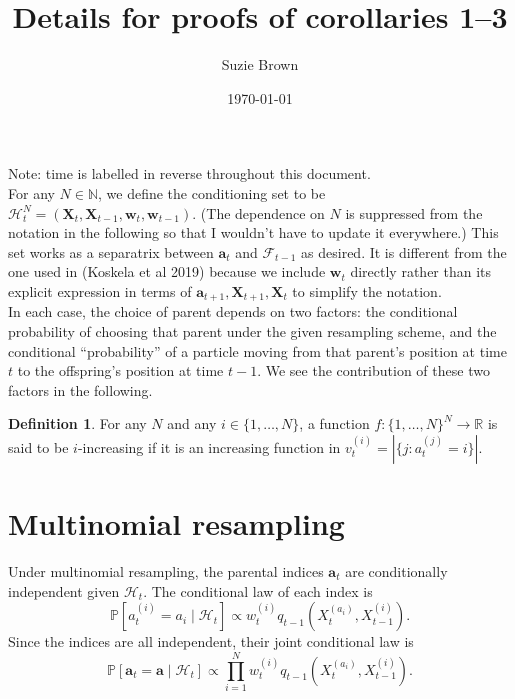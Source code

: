 \documentclass[fleqn]{article}
\title{Details for proofs of corollaries 1--3}
\author{Suzie Brown}
\date{\today}
\theoremstyle{definition}
\newtheorem{defn}{Definition}
\newcommand{\PR}{\mathbb{P}}
\newcommand{\1}[1]{\mathbbm{1}_{\{#1\}}}
\newcommand{\vt}[2][t]{v_{#1}^{(#2)}}
\newcommand{\wt}[2][t]{w_{#1}^{(#2)}}
\begin{document}
\maketitle
\thispagestyle{fancy}
Note: time is labelled in reverse throughout this document.\\

For any $N\in \mathbb{N}$, we define the conditioning set to be $\mathcal{H}_t^N = (\mathbf{X}_t, \mathbf{X}_{t-1}, \mathbf{w}_t, \mathbf{w}_{t-1})$. (The dependence on $N$ is suppressed from the notation in the following so that I wouldn't have to update it everywhere.) This set works as a separatrix between $\mathbf{a}_{t}$ and $\mathcal{F}_{t-1}$ as desired. It is different from the one used in (Koskela et al 2019) because we include $\mathbf{w}_t$ directly rather than its explicit expression in terms of $\mathbf{a}_{t+1}, \mathbf{X}_{t+1}, \mathbf{X}_t$ to simplify the notation.\\

In each case, the choice of parent depends on two factors: the conditional probability of choosing that parent under the given resampling scheme, and the conditional ``probability'' of a particle moving from that parent's position at time $t$ to the offspring's position at time $t-1$. We see the contribution of these two factors in the following.

\begin{defn}
For any $N$ and any $i\in\{1,\dots,N\}$, a function $f: \{1,\dots,N\}^N \to \mathbb{R}$ is said to be $i$-increasing if it is an increasing function in $\vt{i} = |\{j : a_t^{(j)} = i \}|$.
\end{defn}

\section*{Multinomial resampling}

Under multinomial resampling, the parental indices $\mathbf{a}_t$ are conditionally independent given $\mathcal{H}_t$. The conditional law of each index is
\begin{equation*}
\PR [a_t^{(i)} = a_i \mid \mathcal{H}_t] \propto \wt{i} q_{t-1}(X_t^{(a_i)}, X_{t-1}^{(i)}).
\end{equation*}
Since the indices are all independent, their joint conditional law is
\begin{equation*}
\PR [\mathbf{a}_t = \mathbf{a} \mid \mathcal{H}_t] \propto \prod_{i=1}^N \wt{i} q_{t-1}(X_t^{(a_i)}, X_{t-1}^{(i)}).
\end{equation*}
\end{document}
